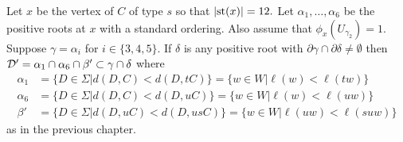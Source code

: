 \documentclass[class=book, crop=false]{standalone}
\begin{document}
\begin{lemma}
	\label{lem:336f2D}
	Let $x$ be the vertex of $C$ of type $s$ so that $|\mathrm{st}(x)|=12.$ Let $\alpha_1,\dots,\alpha_6$ be the positive roots at $x$ with a standard ordering. Also assume that $\phi_x(U_{\gamma_2})=1.$ Suppose $\gamma=\alpha_i$ for $i\in \{3,4,5\}.$ If $\delta$ is any positive root with $\partial\gamma\cap \partial\delta\neq \emptyset$ then $\mathcal{D}'=\alpha_1\cap \alpha_6\cap \beta'\subset \gamma\cap \delta$ where 
	\begin{align*}
		\alpha_1&=\{D\in \Sigma|d(D,C)<d(D,tC)\}=\{w\in W|\ell(w)<\ell(tw)\}\\
		\alpha_6&=\{D\in \Sigma|d(D,C)<d(D,uC)\}=\{w\in W|\ell(w)<\ell(uw)\}\\
		\beta'&=\{D\in \Sigma|d(D,uC)<d(D,usC)\}=\{w\in W|\ell(uw)<\ell(suw)\}
	\end{align*}
	as in the previous chapter.
\end{lemma}
\end{document}

